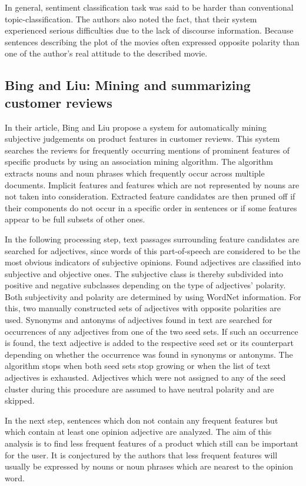 \documentclass[a4paper,11pt]{article}
\begin{document}
In general, sentiment classification task was said to be harder than
conventional topic-classification.  The authors also noted the fact, that
their system experienced serious difficulties due to the lack of discourse
information.  Because sentences describing the plot of the movies often
expressed opposite polarity than one of the author's real attitude to the
described movie.

\subsection{Bing and Liu: Mining and summarizing customer reviews\cite{Bing-Liu-04}}
In their article, Bing and Liu \cite{Bing-Liu-04} propose a system for
automatically mining subjective judgements on product features in customer
reviews.  This system searches the reviews for frequently occurring mentions
of prominent features of specific products by using an association mining
algorithm.  The algorithm extracts nouns and noun phrases which frequently
occur across multiple documents.  Implicit features and features which are not
represented by nouns are not taken into consideration.  Extracted feature
candidates are then pruned off if their components do not occur in a specific
order in sentences or if some features appear to be full subsets of other
ones.

In the following processing step, text passages surrounding feature candidates
are searched for adjectives, since words of this part-of-speech are considered
to be the most obvious indicators of subjective opinions.  Found adjectives
are classified into subjective and objective ones.  The subjective class is
thereby subdivided into positive and negative subclasses depending on the type
of adjectives' polarity.  Both subjectivity and polarity are determined by
using WordNet information.  For this, two manually constructed sets of
adjectives with opposite polarities are used.  Synonyms and antonyms of
adjectives found in text are searched for occurrences of any adjectives from
one of the two seed sets.  If such an occurrence is found, the text adjective
is added to the respective seed set or its counterpart depending on whether
the occurrence was found in synonyms or antonyms.  The algorithm stops when
both seed sets stop growing or when the list of text adjectives is exhausted.
Adjectives which were not assigned to any of the seed cluster during this
procedure are assumed to have neutral polarity and are skipped.

In the next step, sentences which don not contain any frequent features but
which contain at least one opinion adjective are analyzed.  The aim of this
analysis is to find less frequent features of a product which still can be
important for the user.  It is conjectured by the authors that less frequent
features will usually be expressed by nouns or noun phrases which are nearest
to the opinion word.
\end{document}
